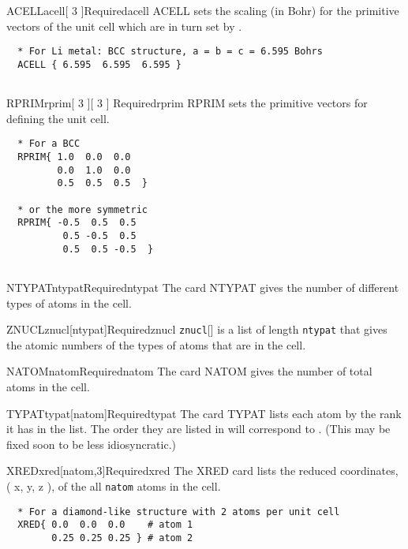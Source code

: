 \documentclass[11pt]{report}
\begin{document}
\begin{Card}{ACELL}{acell[ 3 ]}{Required}{acell}
  ACELL sets the scaling (in Bohr) for the primitive vectors of the unit cell which are in turn set by .

\begin{verbatim}
  * For Li metal: BCC structure, a = b = c = 6.595 Bohrs
  ACELL { 6.595  6.595  6.595 }
  
  \end{verbatim}
\end{Card}

\begin{Card}{RPRIM}{rprim[ 3 ][ 3 ] }{Required}{rprim}
  RPRIM sets the primitive vectors for defining the unit cell. 
  
  \begin{verbatim}
  * For a BCC
  RPRIM{ 1.0  0.0  0.0
         0.0  1.0  0.0
         0.5  0.5  0.5  }
  
  * or the more symmetric
  RPRIM{ -0.5  0.5  0.5
          0.5 -0.5  0.5
          0.5  0.5 -0.5  }
         
  \end{verbatim}
\end{Card}

\begin{Card}{NTYPAT}{ntypat}{Required}{ntypat}
The card NTYPAT gives the number of different types of atoms in the cell. 
\end{Card}

\begin{Card}{ZNUCL}{znucl[ntypat]}{Required}{znucl}
\texttt{znucl}[] is a list of length \texttt{ntypat} that gives the atomic numbers of the types of atoms that are in the cell.
\end{Card}

\begin{Card}{NATOM}{natom}{Required}{natom}
The card NATOM gives the number of total atoms in the cell.
\end{Card}

\begin{Card}{TYPAT}{typat[natom]}{Required}{typat}
The card TYPAT lists each atom by the rank it has in the  list. The order they are listed in will correspond to . (This may be fixed soon to be less idiosyncratic.)
\end{Card}

\begin{Card}{XRED}{xred[natom,3]}{Required}{xred}
The XRED card lists the reduced coordinates, ( x, y, z ), of the all \texttt{natom} atoms in the cell.
  \begin{verbatim}
  * For a diamond-like structure with 2 atoms per unit cell
  XRED{ 0.0  0.0  0.0    # atom 1
        0.25 0.25 0.25 } # atom 2
  \end{verbatim}
\end{Card}
\end{document}
